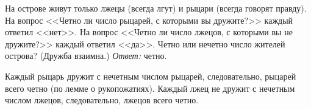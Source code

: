 \problem
На острове живут только лжецы (всегда лгут) и рыцари (всегда говорят правду).
На вопрос <<Четно ли число рыцарей, с которыми вы дружите?>> каждый ответил
<<нет>>.
На вопрос <<Четно ли число лжецов, с которыми вы не дружите?>> каждый ответил
<<да>>.
Четно или нечетно число жителей острова?
(Дружба взаимна.)
\solution
\emph{Ответ:} четно.
\par
Каждый рыцарь дружит с нечетным числом рыцарей, следовательно, рыцарей всего
четно (по лемме о рукопожатиях).
Каждый лжец не дружит с нечетным числом лжецов, следовательно, лжецов всего
четно.
\endproblem
